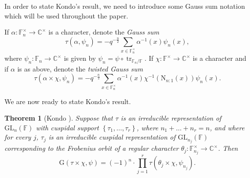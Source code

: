 \documentclass[12pt, reqno]{amsart}
\newtheorem{theorem}{Theorem}[section]
\theoremstyle{definition}
\theoremstyle{definition}
\theoremstyle{definition}
\newcommand{\cComplex}{\mathbb{C}}
\newcommand{\multiplicativegroup}[1]{#1^{\times}}
\newcommand{\fieldCharacter}{\psi}
\newcommand{\trace}{\operatorname{tr}}
\newcommand{\GL}{\mathrm{GL}}
\newcommand{\FieldNorm}[2]{\mathrm{N}_{#1:#2}}
\newcommand{\finiteField}{\mathbb{F}}
\newcommand{\finiteFieldExtension}[1]{\finiteField_{#1}}
\newcommand{\GaussSumSingleCharacter}[2]{\tau\left(#1, #2\right)}
\newcommand{\GaussSumScalar}[2]{\mathrm{G}\left(#1, #2\right)}
\newcommand{\GaussSumCharacter}[3]{\tau\left(#1 \times #2, #3\right)}
\begin{document}
In order to state Kondo's result, we need to introduce some Gauss sum notation which will be used throughout the paper.

If $\alpha \colon \multiplicativegroup{\finiteFieldExtension{n}} \to \multiplicativegroup{\cComplex}$ is a character, denote the \emph{Gauss sum} $$\GaussSumSingleCharacter{\alpha}{\fieldCharacter_n} = -q^{-\frac{n}{2}}\sum_{x \in \multiplicativegroup{\finiteFieldExtension{n}}} \alpha^{-1}\left(x\right) \fieldCharacter_n\left(x\right),$$where $\fieldCharacter_n \colon \finiteFieldExtension{n} \to \multiplicativegroup{\cComplex}$ is given by $\fieldCharacter_n = \fieldCharacter \circ \trace_{\finiteFieldExtension{n} \slash \finiteField}$. If $\chi \colon \multiplicativegroup{\finiteField} \to \multiplicativegroup{\cComplex}$ is a character and if $\alpha$ is as above, denote the \emph{twisted Gauss sum}
$$\GaussSumCharacter{\alpha}{\chi}{\fieldCharacter_n} = -q^{-\frac{n}{2}}\sum_{x \in \multiplicativegroup{\finiteFieldExtension{n}}} \alpha^{-1}\left(x\right) \chi^{-1}\left( \FieldNorm{n}{1}\left(x\right)\right) \fieldCharacter_n\left(x\right).$$

We are now ready to state Kondo's result.
\begin{theorem}[Kondo {\cite{Kondo1963}}]
	Suppose that $\tau$ is an irreducible representation of $\GL_n\left(\finiteField\right)$ with cuspidal support $\left\{\tau_1,\dots, \tau_r\right\}$, where $n_1 + \dots + n_r = n$, and where for every $j$, $\tau_j$ is an irreducible cuspidal representation of $\GL_{n_j}\left(\finiteField\right)$ corresponding to the Frobenius orbit of a regular character $\theta_j \colon \multiplicativegroup{\finiteFieldExtension{n_j}} \to \multiplicativegroup{\cComplex}$. Then
	$$\GaussSumScalar{\tau \times \chi}{\fieldCharacter} = \left(-1\right)^n \cdot \prod_{j=1}^r \GaussSumCharacter{\theta_j}{\chi}{\fieldCharacter_{n_j}}.$$
\end{theorem}
\end{document}
